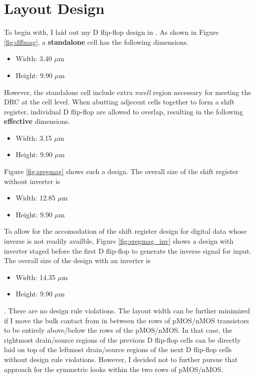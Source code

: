 \documentclass[11pt]{article}
\begin{document}
\section{Layout Design}
    To begin with, I laid out my D flip-flop design in . As shown in Figure \ref{fig:dffmag}, a \textbf{standalone} cell has the following dimensions.
    \begin{itemize}
        \item Width: 3.40 $\mu$m
        \item Height: 9.90 $\mu$m
    \end{itemize} 
    However, the standalone cell include extra \textit{nwell} region necessary for meeting the DRC at the cell level. When abutting adjecent cells together to form a shift register, individual D flip-flop are allowed to overlap, resulting in the following \textbf{effective} dimensions.
    \begin{itemize}
        \item Width: 3.15 $\mu$m
        \item Height: 9.90 $\mu$m
    \end{itemize} 
    Figure \ref{fig:sregmag} shows such a design. The overall size of the shift register without inverter is 
    \begin{itemize}
        \item Width: 12.85 $\mu$m
        \item Height: 9.90 $\mu$m
    \end{itemize}
    To allow for the accomodation of the shift register design for digital data whose inverse is not readily availble, Figure \ref{fig:sregmag_inv} shows a design with inverter staged before the first D flip-flop to generate the inverse signal for input. The overall size of the design with an inverter is 
    \begin{itemize}
        \item Width: 14.35 $\mu$m
        \item Height: 9.90 $\mu$m 
    \end{itemize}.
    There are no design rule violations. The layout width can be further minimized if I move the bulk contact from in between the rows of pMOS/nMOS transistors to be entirely above/below the rows of the pMOS/nMOS. In that case, the rightmost drain/source regions of the previous D flip-flop cells can be directly laid on top of the leftmost drain/source regions of the next D flip-flop cells without design rule violations. However, I decided not to further pursue that approach for the symmetric looks within the two rows of pMOS/nMOS.
\end{document}
